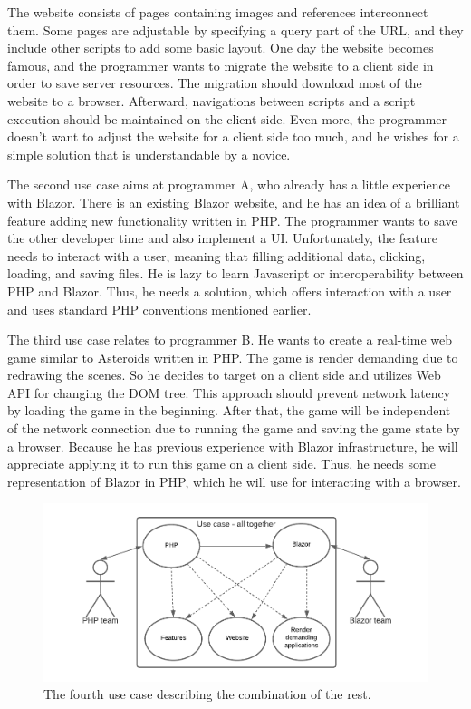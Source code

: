 The website consists of pages containing images and references interconnect them.
Some pages are adjustable by specifying a query part of the URL, and they include other scripts to add some basic layout.
One day the website becomes famous, and the programmer wants to migrate the website to a client side in order to save server resources.
The migration should download most of the website to a browser.
Afterward, navigations between scripts and a script execution should be maintained on the client side.
Even more, the programmer doesn't want to adjust the website for a client side too much, and he wishes for a simple solution that is understandable by a novice.
\par
The second use case aims at programmer A, who already has a little experience with Blazor.
There is an existing Blazor website, and he has an idea of a brilliant feature adding new functionality written in PHP.
The programmer wants to save the other developer time and also implement a UI.
Unfortunately, the feature needs to interact with a user, meaning that filling additional data, clicking, loading, and saving files.
He is lazy to learn Javascript or interoperability between PHP and Blazor.
Thus, he needs a solution, which offers interaction with a user and uses standard PHP conventions mentioned earlier.
\par
The third use case relates to programmer B.
He wants to create a real-time web game similar to Asteroids written in PHP.
The game is render demanding due to redrawing the scenes.
So he decides to target on a client side and utilizes Web API for changing the DOM tree.
This approach should prevent network latency by loading the game in the beginning.
After that, the game will be independent of the network connection due to running the game and saving the game state by a browser. 
Because he has previous experience with Blazor infrastructure, he will appreciate applying it to run this game on a client side.
Thus, he needs some representation of Blazor in PHP, which he will use for interacting with a browser.
\par
\begin{figure}[b]\centering
\includegraphics[scale=0.8]{./img/UseCaseAllTogether}
\caption{The fourth use case describing the combination of the rest.}
\label{img09:usecase}
\end{figure} 
